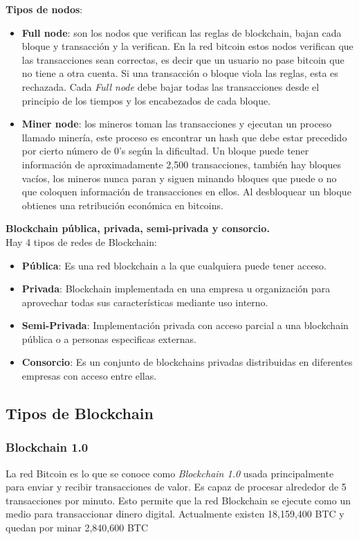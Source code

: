 \documentclass[a4paper,12pt]{/home/armando/Documentos/Cursos/LaTeX/Plantillas/lib/pub}
\begin{document}
\textbf{Tipos de nodos}:
\begin{itemize}
	\item \textbf{Full node}: son los nodos que verifican las reglas de blockchain, bajan cada bloque y transacción y la verifican. En la red bitcoin estos nodos verifican que las transacciones sean correctas, es decir que un usuario no pase bitcoin que no tiene a otra cuenta.
	Si una transacción o bloque viola las reglas, esta es rechazada.
	Cada \textit{Full node} debe bajar todas las transacciones desde el principio de los tiempos y los encabezados de cada bloque.
	
	\item \textbf{Miner node}: los mineros toman las transacciones y ejecutan un proceso llamado minería, este proceso es encontrar un hash que debe estar precedido por cierto número de 0's según la dificultad. Un bloque puede tener información de aproximadamente 2,500 transacciones, también hay bloques vacíos, los mineros nunca paran y siguen minando bloques que puede o no que coloquen información de transacciones en ellos. Al desbloquear un bloque obtienes una retribución económica en bitcoins.\\
\end{itemize}

\textbf{Blockchain pública, privada, semi-privada y consorcio.}\\

Hay 4 tipos de redes de Blockchain:
\begin{itemize}
	\item \textbf{Pública}: Es una red blockchain a la que cualquiera puede tener acceso.
	\item  \textbf{Privada}: Blockchain implementada en una empresa u organización para aprovechar todas sus características mediante uso interno.
	\item \textbf{Semi-Privada}: Implementación privada con acceso parcial a una blockchain pública o a personas especificas externas.
	\item \textbf{Consorcio}: Es un conjunto de blockchains privadas distribuidas en diferentes empresas con acceso entre ellas.
\end{itemize}
\newpage
\subsection{Tipos de Blockchain}
\subsubsection{Blockchain 1.0}
La red Bitcoin es lo que se conoce como \textit{Blockchain 1.0} usada principalmente para enviar y recibir transacciones de valor. Es capaz de procesar alrededor de 5 transacciones por minuto. Esto permite que la red Blockchain se ejecute como un medio para transaccionar dinero digital. Actualmente existen 18,159,400 BTC y quedan por minar 2,840,600 BTC\\
\end{document}
